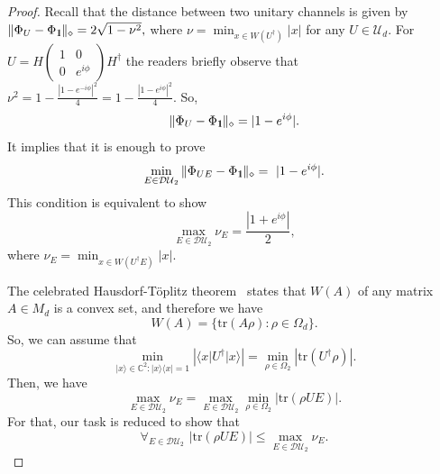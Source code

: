 \documentclass[preprint,12pt, a4paper, dvipsnames]{elsarticle}
\newcommand{\ket}[1]{\ensuremath{|#1\rangle}}
\newcommand{\bra}[1]{\ensuremath{\langle#1|}}
\newcommand{\ketbra}[2]{\ensuremath{\ket{#1}\bra{#2}}}
\newcommand{\proj}[1]{\ensuremath{\ketbra{#1}{#1}}}
\newcommand{\1}{{\rm 1\hspace{-0.9mm}l}}
\newcommand{\Id}{{\rm 1\hspace{-0.9mm}l}}
\newcommand{\diaguni}{\ensuremath{\mathcal{DU}}}
\newcommand{\tr}{\mathrm{tr}}
\begin{document}
\begin{proof} Recall that the distance between two unitary channels is given by
	$
	\| \Phi_U  - \Phi_{\1} \|_\diamond = 2 \sqrt{1-\nu^2},
	$
	where $\nu = \min_{x \in W(U^\dagger)} |x|  $ for any $U \in \mathcal{U}_d$.
	For $U = H
	\left(\begin{array}{cc}1&0\\0&e^{i \phi}\end{array}\right)  H^\dagger$ the readers briefly observe that  $\nu^2 = 1 - \frac{|1 - e^{-i \phi} |^2 }{4} = 1 - \frac{|1 - e^{i \phi} |^2 }{4}$. So,
	\begin{equation}
	\|  \Phi_U  - \Phi_{\1} \|_\diamond = | 1 - e^{i \phi} |.
	\end{equation}
	It implies that it is enough to prove  \begin{equation}
	\min_{E \in \diaguni_2} \|\Phi_{UE} -
	\Phi_\Id\|_\diamond  = | 1 - e^{i \phi} |.
	\end{equation}
	This condition is equivalent to show
	\begin{equation}
	\max_{E \in \diaguni_2 } \nu_{E} = \frac{|1 + e^{i \phi} | }{2},
	\end{equation}
	where $\nu_E = \min_{x \in W(U^\dagger E)} |x|. $

	The celebrated Hausdorf-T{\"o}plitz theorem~\cite{hausdorff, toeplitz} states that
	$W(A)$ of any matrix $A \in M_d$ is a convex set, and therefore we have
	\begin{equation}
	W(A) = \{ \tr(A \rho): \rho \in \Omega_d\}.
	\end{equation}
	So, we can assume that
	\begin{equation}
	\min_{\ket{x} \in \mathbb{C}^2:   \proj{x} = 1} |\bra{x}U^\dagger\ket{x}| =
	\min_{\rho \in \Omega_2} |\tr(U^\dagger\rho)|.
	\end{equation}
	Then, we have
	\begin{equation}
	\max_{E \in \diaguni_2 } \nu_{E}  = \max_{E \in \diaguni_2 }  \min_{\rho \in
		\Omega_2} \left| \tr \left( \rho U E \right) \right|.
	\end{equation}
	For that, our task is reduced to show that
	\begin{equation}
	\forall_{E \in \diaguni_2} \,\, | \tr \left(\rho U E\right) | \le \max_{E \in \diaguni_2 } \nu_{E}.
	\end{equation}




\end{proof}
\end{document}
